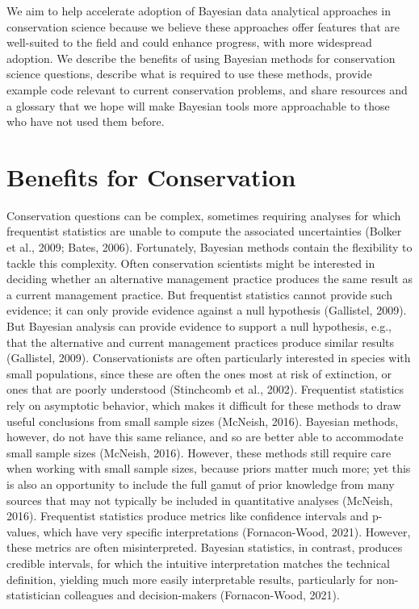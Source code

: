 \documentclass{article}
\begin{document}
\par We  aim to help accelerate adoption of Bayesian data analytical approaches in conservation science because we believe these approaches offer features that are well-suited to the field and could enhance progress, with more  widespread adoption. We describe the benefits of using Bayesian methods for conservation science questions, describe what is required to use these methods, provide example code relevant to current conservation problems, and share resources and a glossary that we hope will make Bayesian tools more approachable to those who have not used them before.

\section* {Benefits for Conservation}
Conservation questions can be complex, sometimes requiring analyses for which frequentist statistics are unable to compute the associated uncertainties (Bolker et al., 2009; Bates, 2006).  Fortunately, Bayesian methods contain the flexibility to tackle this complexity. 
Often conservation scientists might be interested in deciding whether an alternative management practice produces the same result as a current management practice. But frequentist statistics cannot provide such evidence; it can only provide evidence against a null hypothesis (Gallistel, 2009). But Bayesian analysis can provide evidence to support a null hypothesis, e.g., that the alternative and current management practices produce similar results (Gallistel, 2009). 
Conservationists are often particularly interested in species with small populations, since these are often the ones most at risk of extinction, or ones that are poorly understood (Stinchcomb et al., 2002). Frequentist statistics rely on asymptotic behavior, which makes it difficult for these methods to draw useful conclusions from small sample sizes (McNeish, 2016). Bayesian methods, however, do not have this same reliance, and so are better able to accommodate small sample sizes (McNeish, 2016). However, these methods still require care when working with small sample sizes, because priors matter much more; yet this is also an opportunity to include the full gamut of prior knowledge from many sources that may not typically be included in quantitative analyses (McNeish, 2016). 
Frequentist statistics produce metrics like confidence intervals and p-values, which have very specific interpretations (Fornacon-Wood, 2021). However, these metrics are often misinterpreted. Bayesian statistics, in contrast, produces credible intervals, for which the intuitive interpretation matches the technical definition, yielding much more easily interpretable results, particularly for non-statistician colleagues and decision-makers (Fornacon-Wood, 2021). 
\end{document}
